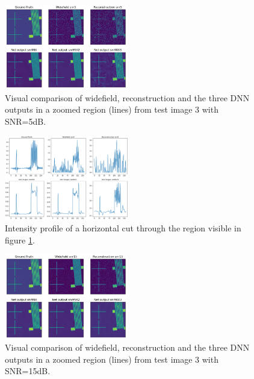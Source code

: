\documentclass[conference]{IEEEtran}
\begin{document}
\begin{figure}[h!]
    \centering
    \includegraphics[width=0.48\textwidth]{images/test_img_3_model_comp_snr5_cross.png}
    \caption{Visual comparison of widefield, reconstruction and the three DNN outputs in a zoomed region (lines) from test image 3 with SNR=5dB.}
    \label{fig:test_img_3_model_comp_snr5_cross}
\end{figure}
\begin{figure}[h!]
    \centering
    \includegraphics[width=0.48\textwidth]{images/test_img_3_model_comp_snr5_cross_cut.png}
    \caption{Intensity profile of a horizontal cut through the region visible in figure \ref{fig:test_img_3_model_comp_snr5_cross}.}
    \label{fig:test_img_3_model_comp_snr5_cross_cut}
\end{figure}
\begin{figure}[h!]
    \centering
    \includegraphics[width=0.48\textwidth]{images/test_img_3_model_comp_snr15_cross.png}
    \caption{Visual comparison of widefield, reconstruction and the three DNN outputs in a zoomed region (lines) from test image 3 with SNR=15dB.}
    \label{fig:test_img_3_model_comp_snr15_cross}
\end{figure}
\end{document}
